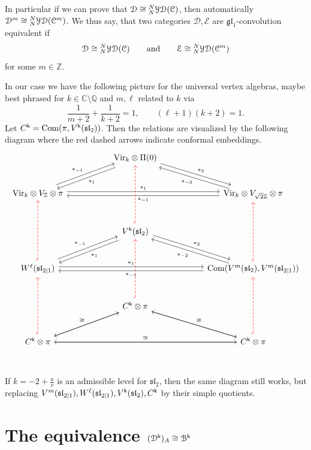 \documentclass[a4paper, reqno]{amsart}
\theoremstyle{introTheorems}
\newcommand\cB{\mathcal{B}}
\newcommand\cC{\mathcal{C}}
\newcommand\cD{\mathcal{D}}
\newcommand\cE{\mathcal{E}}
\newcommand\Vir{\textup{Vir}}
\renewcommand{\1}{\mathbbold{1}}
\begin{document}
 In particular if we can prove that $\cD \cong \YD{N}(\cC)$, then automatically $\cD^m \cong \YD{N}(\cC^m)$. 
 We thus say, that two categories $\cD, \cE$ are $\mathfrak{gl}_1$-convolution equivalent if 
 \[
 \cD \cong \YD{N}(\cC) \qquad \text{and}
 \qquad 
 \cE \cong \YD{N}(\cC^m)
 \]
 for some $m \in \mathbb Z$.

In our case we have the following picture for the universal vertex algebras, maybe best phrased for $k \in \mathbb C\setminus \mathbb Q$ and $m, \ell$ related to $k$ via
\[
\frac{1}{m+2}+ \frac{1}{k+2} = 1, \qquad (\ell+1)(k+2) =1.  
\]
Let $C^{\mathsf{k}} = \text{Com}(\pi, V^{\mathsf{k}}(\mathfrak{sl}_2))$. Then the relations are visualized by the following diagram where the red dashed arrows indicate conformal embeddings. 
\[
\begin{tikzcd}[row sep=6ex, column sep=12ex]
& \Vir_{k} \otimes \Pi(0) \arrow[dl, shift left, "*_1"]  \arrow[dr, shift left, "*_2"]  \\
\Vir_{k} \otimes V_{\mathbb Z} \otimes \pi \arrow[ur, shift left, "*_{-1}"] \arrow[rr, shift left, "*_1"] &&
\Vir_{k} \otimes V_{\sqrt{2}\mathbb Z} \otimes \pi \arrow[ul, shift left, "*_{-2}"]\arrow[ll, shift left, "*_{-1}"] \\
& V^{\k}(\mathfrak{sl}_2)  \arrow[uu, hook, red, dashed] \arrow[dl, shift left, "*_1"]  \arrow[dr, shift left, "*_2"] \\ 
W^{\ell}(\mathfrak{sl}_{2|1}) \arrow[uu, hook, red, dashed] \arrow[ur, shift left, "*_{-1}"] \arrow[rr, shift left, "*_1"] &&
\text{Com}(V^m(\mathfrak{sl}_2), V^m(\mathfrak{sl}_{2|1})) \arrow[uu, hook, red, dashed] \arrow[ul, shift left, "*_{-2}"]\arrow[ll, shift left, "*_{-1}"] \\
& C^{\k} \otimes \pi  \arrow[uu, hook, red, dashed] \arrow[dl]  \arrow[dr, "\cong"] \\ 
C^{\k} \otimes \pi \arrow[uu, hook, red, dashed] \arrow[ur, "\cong"] \arrow[rr, "\cong"] &&
C^{\k} \otimes \pi \arrow[uu, hook, red, dashed] \arrow[ul]\arrow[ll] \\
\end{tikzcd}
\]
If $k = -2 +\frac{u}{v}$ is an admissible level for $\mathfrak{sl}_2$, then the same diagram still works, but replacing $V^m(\mathfrak{sl}_{2|1}), W^{\ell}(\mathfrak{sl}_{2|1}), V^{\mathsf{k}}(\mathfrak{sl}_2), C^{\mathsf{k}}$ by their simple quotients. 

\section{The equivalence \texorpdfstring{$(\catD^\k)_A\cong \cB^\k$}{DA with B}}\label{sec_equivalenceBorel}
\end{document}

